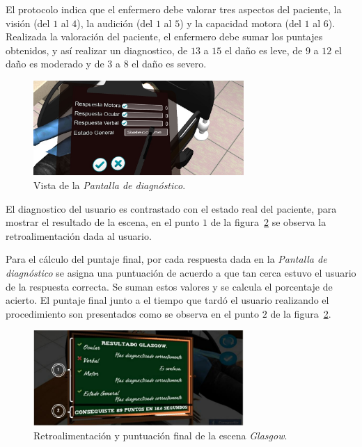 El protocolo indica que el enfermero debe valorar tres aspectos del paciente,
la visión (del $1$ al $4$), la audición (del $1$ al $5$) y la capacidad motora
(del $1$ al $6$)\cite{protocolo}. Realizada la valoración del
paciente, el enfermero debe sumar los puntajes obtenidos, y así realizar un
diagnostico, de $13$ a $15$ el daño es leve, de $9$ a $12$ el daño es moderado y
de $3$ a $8$ el daño es severo\cite{helmick2007mild}.


\begin{figure}
\centering
\includegraphics[width=8cm]{../solucion/images/glasgow_diagnostico.jpg}
\caption{Vista de la \emph{Pantalla de diagnóstico}.}
\label{fig:glasgow_gui_resultados}
\end{figure}

El diagnostico del usuario es contrastado con el estado real del paciente, para
mostrar el resultado de la escena, en el punto $1$ de la
figura~\ref{fig:glasgow_resultado} se observa la retroalimentación dada al
usuario.

Para el cálculo del puntaje final, por cada respuesta dada en la \emph{Pantalla
    de diagnóstico} se asigna una puntuación de acuerdo a que tan cerca estuvo
el usuario de la respuesta correcta. Se suman estos valores y se calcula el
porcentaje de acierto. El puntaje final junto a el tiempo que tardó el usuario
realizando el procedimiento son presentados como se observa en el punto $2$ de
la figura~\ref{fig:glasgow_resultado}.

\begin{figure}
\centering
\includegraphics[width=8cm]{../solucion/images/glasgow_resultado.jpg}
\caption{Retroalimentación y puntuación final de la escena \emph{Glasgow}.}
\label{fig:glasgow_resultado}
\end{figure}
